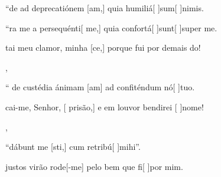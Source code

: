 {  {\item {}``de ad deprecatiónem [am,] quia humiliá[ ]{sum}[ ]{ni}mis.~\Antiphona
      \item {}``ra me a persequénti[ me,] quia confortá[ ]{sunt}[ ]{su}per me.~\Antiphona}%
    {\item {}tai meu clamor, minha [ce,] porque fui por demais \-do!~\Antiphona},
  {\item {}`` de custédia ánimam [am] ad confitén\-dum nó[ ]{tu}o.~\Antiphona}%
    {\item {}cai-me, Senhor, [ prisão,] e em louvor bendirei [ ]{no}me!~\Antiphona},
  {\item {}``dábunt me [sti,] cum retribú[ ]{mi}\-hi''.~\Antiphona}%
    {\item {} justos virão rode[-me] pelo bem que fi[ ]{por} mim.~\Antiphona}
}